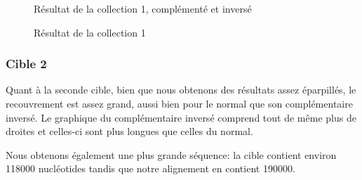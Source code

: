\begin{figure}[!ht]
\begin{minipage}[c]{.46 \linewidth}
\begin{center}
			Résultat de la collection 1, complémenté et inversé
		\end{center}
	\end{minipage}
	\caption{Résultat de la collection 1}
\end{figure}

\FloatBarrier

\subsubsection*{Cible 2}

Quant à la seconde cible, bien que nous obtenons des résultats assez éparpillés,
le recouvrement est assez grand, aussi bien pour le normal que son
complémentaire inversé.
Le graphique du complémentaire inversé comprend tout de même plus de droites et
celles-ci sont plus longues que celles du normal.

Nous obtenons également une plus grande séquence: la cible contient environ
118000 nucléotides tandis que notre alignement en contient 190000.


